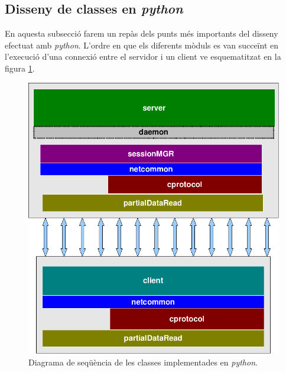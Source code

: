 \documentclass[a4paper,10pt]{article}
\begin{document}
	\subsection{Disseny de classes en \emph{python}}
	En aquesta subsecció farem un repàs dels punts més importants del disseny efectuat amb \emph{python}. L'ordre en que els diferents mòduls es van succeïnt en l'execució d'una connexió entre el servidor i un client ve esquematitzat en la figura \ref{piram_py}.
			\begin{figure}[h]
			\begin{center}
			\includegraphics[scale=0.35]{piramide_py.png}
			\caption{Diagrama de seqüència de les classes implementades en \emph{python}.}
			\label{piram_py}
			\end{center}
			\end{figure}
\end{document}
